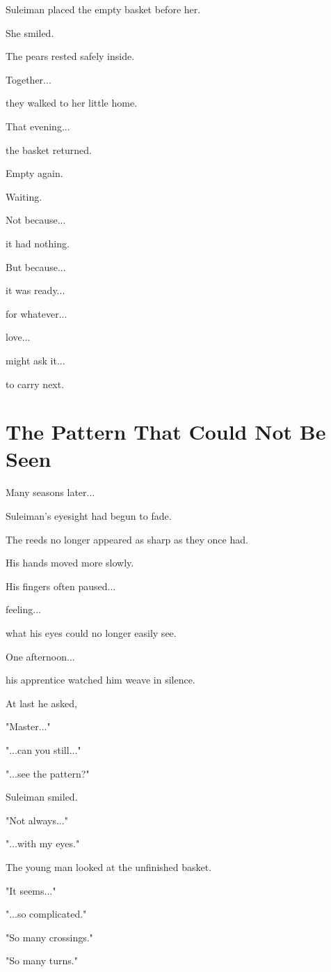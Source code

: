 \documentclass[12pt,openany]{book}
\begin{document}
Suleiman placed the empty basket before her.

She smiled.

The pears rested safely inside.

Together...

they walked to her little home.

That evening...

the basket returned.

Empty again.

Waiting.

Not because...

it had nothing.

But because...

it was ready...

for whatever...

love...

might ask it...

to carry next.
\section*{The Pattern That Could Not Be Seen}

Many seasons later...

Suleiman's eyesight had begun to fade.

The reeds no longer appeared as sharp as they once had.

His hands moved more slowly.

His fingers often paused...

feeling...

what his eyes could no longer easily see.

One afternoon...

his apprentice watched him weave in silence.

At last he asked,

"Master..."

"...can you still..."

"...see the pattern?"

Suleiman smiled.

"Not always..."

"...with my eyes."

The young man looked at the unfinished basket.

"It seems..."

"...so complicated."

"So many crossings."

"So many turns."
\end{document}
